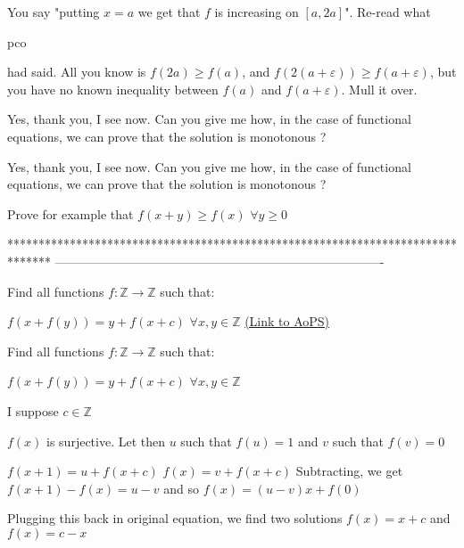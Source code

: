 \begin{solution}
	You say "putting $x=a$ we get that $f$ is increasing on $[a,2a]$". Re-read what \begin{bolded}pco\end{bolded} had said. All you know is $f(2a) \geq f(a)$, and $f(2(a+\varepsilon)) \geq f(a+\varepsilon)$, but you have no known inequality between $f(a)$ and $f(a+\varepsilon)$. Mull it over.
\end{solution}



\begin{solution}
	Yes, thank you, I see now. Can you give me how, in the case of functional equations, we can prove that the solution is monotonous ?
\end{solution}



\begin{solution}
	\begin{tcolorbox}Yes, thank you, I see now. Can you give me how, in the case of functional equations, we can prove that the solution is monotonous ?\end{tcolorbox}
Prove for example that $f(x+y)\ge f(x)$ $\forall y\ge 0$
\end{solution}
*******************************************************************************
-------------------------------------------------------------------------------

\begin{problem}
	Find all functions $ f: \mathbb{Z}\to \mathbb{Z} $ such that:

$ f(x+f(y))=y+f(x+c) $  $ \forall x,y\in\mathbb{Z} $
	\flushright \href{https://artofproblemsolving.com/community/c6h570904}{(Link to AoPS)}
\end{problem}



\begin{solution}
	\begin{tcolorbox}Find all functions $ f: \mathbb{Z}\to \mathbb{Z} $ such that:

$ f(x+f(y))=y+f(x+c) $  $ \forall x,y\in\mathbb{Z} $\end{tcolorbox}
I suppose $c\in\mathbb Z$

$f(x)$ is surjective. Let then $u$ such that $f(u)=1$ and $v$ such that $f(v)=0$

$f(x+1)=u+f(x+c)$
$f(x)=v+f(x+c)$
Subtracting, we get $f(x+1)-f(x)=u-v$ and so $f(x)=(u-v)x+f(0)$
 
Plugging this back in original equation, we find two solutions $\boxed{f(x)=x+c}$ and $\boxed{f(x)=c-x}$
\end{solution}



